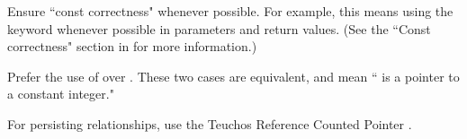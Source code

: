 \be
\item Ensure ``const correctness" whenever possible. For example, this means using the  keyword whenever possible
      in parameters and return values. (See the ``Const correctness" section in \cite{Cl2010} for more information.)
\item Prefer the use of  over .  These two cases are equivalent, and mean `` is a pointer to
a constant integer."
\item For persisting relationships, use the Teuchos Reference Counted Pointer \cite{Ba2007,Ba2010}.
\ee
